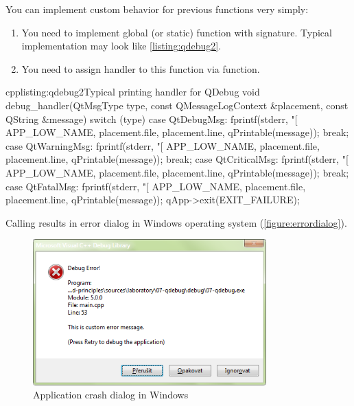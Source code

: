 You can implement custom behavior for previous functions very simply:
\begin{enumerate}
\item
You need to implement global (or static) function with signature. Typical\\ implementation may look like \autoref{listing:qdebug2}.

\item
You need to assign handler to this function via function.
\end{enumerate}

\begin{fdoccode}{cpp}{listing:qdebug2}{Typical printing handler for QDebug}
void debug_handler(QtMsgType type, const QMessageLogContext &placement, const QString &message) {
    switch (type) {
	case QtDebugMsg:
	    fprintf(stderr, "[%
		    APP_LOW_NAME,
		    placement.file,
		    placement.line,
		    qPrintable(message));
	    break;
	case QtWarningMsg:
	    fprintf(stderr, "[%
		    APP_LOW_NAME,
		    placement.file,
		    placement.line,
		    qPrintable(message));
	    break;
	case QtCriticalMsg:
	    fprintf(stderr, "[%
		    APP_LOW_NAME,
		    placement.file,
		    placement.line,
		    qPrintable(message));
	    break;
	case QtFatalMsg:
	    fprintf(stderr, "[%
		    APP_LOW_NAME,
		    placement.file,
		    placement.line,
		    qPrintable(message));
	    qApp->exit(EXIT_FAILURE);
    }
}
\end{fdoccode}

Calling results in error dialog in Windows operating system (\autoref{figure:errordialog}).

\begin{figure}[ht]
\centering\includegraphics[width=9cm]{graphics/laboratory/11-debugdialog.png}
\caption{Application crash dialog in Windows}\label{figure:errordialog}
\end{figure}

